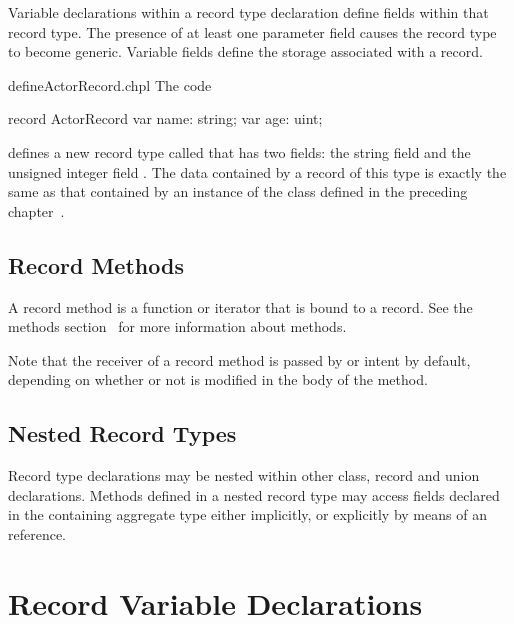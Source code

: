 Variable declarations within a record type declaration define fields within that
record type.  The presence of at least one parameter field causes the record
type to become generic.  Variable fields define the storage associated with a
record.

\begin{chapelexample}{defineActorRecord.chpl}
The code
\begin{chapel}
record ActorRecord {
  var name: string;
  var age: uint;
}
\end{chapel}
\begin{chapeloutput}
\end{chapeloutput}
defines a new record type called  that has two fields: the
string field  and the unsigned integer field .  The data
contained by a record of this type is exactly the same as that contained by
an instance of the  class defined in the preceding
chapter~.
\end{chapelexample}

\subsection{Record Methods}
\label{Record_Methods}

A record method is a function or iterator that is bound to a record.
See the methods section~ for more information about
methods.

Note that the receiver of a record method is passed by  or
 intent by default, depending on whether or not
 is modified in the body of the method.

\subsection{Nested Record Types}
\label{Nested_Record_Types}

Record type declarations may be nested within other class, record and union
declarations.  Methods defined in a nested record type may access fields
declared in the containing aggregate type either implicitly, or explicitly by
means of an  reference.

\section{Record Variable Declarations}
\label{Record_Variable_Declarations}

